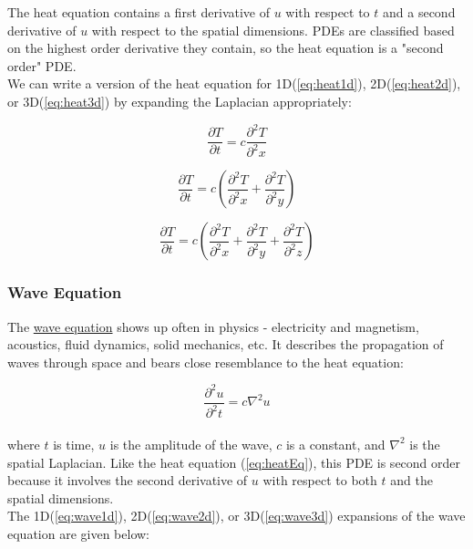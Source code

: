 {    The heat equation contains a first derivative of $u$ with respect to $t$ and a second derivative of $u$ with respect to the spatial dimensions.  PDEs are classified based on the highest order derivative they contain, so the heat equation is a "second order" PDE.\\
    
     We can write a version of the heat equation for 1D(\ref{eq:heat1d}), 2D(\ref{eq:heat2d}), or 3D(\ref{eq:heat3d}) by expanding the Laplacian appropriately:
 
 \begin{equation}\label{eq:heat1d}
  \frac{\partial T}{\partial t} = c\frac{\partial^{2}T}{\partial^{2}x}
  \end{equation}
  
   \begin{equation}\label{eq:heat2d}
  \frac{\partial T}{\partial t} = c\left(\frac{\partial^{2}T}{\partial^{2}x}+\frac{\partial^{2}T}{\partial^{2}y}\right)
  \end{equation}
  
   \begin{equation}\label{eq:heat3d}
  \frac{\partial T}{ \partial t} = c\left(\frac{\partial^{2}T}{\partial^{2}x}+\frac{\partial^{2}T}{\partial^{2}y}+\frac{\partial^{2}T}{\partial^{2}z} \right)
  \end{equation}
  
\subsubsection{Wave Equation}

 The \href{https://en.wikipedia.org/wiki/Wave_equation}{wave equation} shows up often in physics - electricity and magnetism, acoustics, fluid dynamics, solid mechanics, etc.  It describes the propagation of waves through space and bears close resemblance to the heat equation:

 \begin{equation}\label{eq:waveEq}
 \frac{\partial^{2}u}{\partial^{2}t} = c\nabla^{2}u
   \end{equation}
     \\
 where $t$ is time, $u$ is the amplitude of the wave, $c$ is a constant, and $\nabla^{2}$ is the spatial Laplacian.  Like the heat equation (\ref{eq:heatEq}), this PDE is second order because it involves the second derivative of $u$ with respect to both $t$ and the spatial dimensions. \\
 
The 1D(\ref{eq:wave1d}), 2D(\ref{eq:wave2d}), or 3D(\ref{eq:wave3d}) expansions of the wave equation are given below:
 
}

